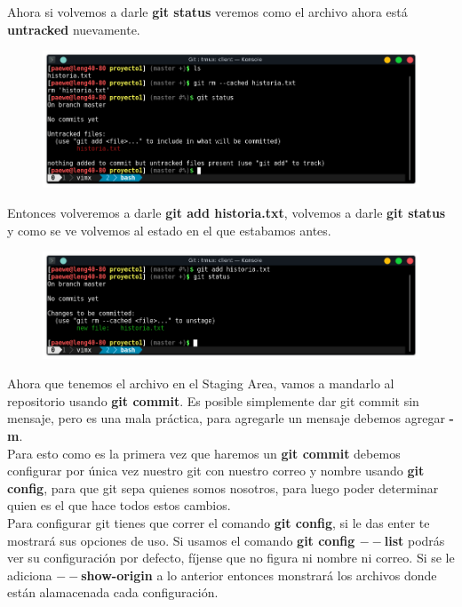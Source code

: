 \documentclass{article}
\begin{document}
Ahora si volvemos a darle \textbf{git status} veremos como el archivo ahora
está \textbf{untracked} nuevamente.

\begin{figure}[h!]
  \centering
  \includegraphics[scale=0.75]{./Pictures/074_quitar_staged.png}
\end{figure}

\newpage

Entonces volveremos a darle \textbf{git add historia.txt}, volvemos a darle
\textbf{git status} y como se ve volvemos al estado en el que estabamos antes.

\begin{figure}[h!]
  \centering
  \includegraphics[scale=0.75]{./Pictures/075_staged_again.png}
\end{figure}


Ahora que tenemos el archivo en el Staging Area, vamos a mandarlo al
repositorio usando \textbf{git commit}. Es posible simplemente dar git commit
sin mensaje, pero es una mala práctica, para agregarle un mensaje debemos
agregar \textbf{-m}.\\

Para esto como es la primera vez que haremos un \textbf{git commit} debemos
configurar por única vez nuestro git con nuestro correo y nombre usando
\textbf{git config}, para que git sepa quienes somos nosotros, para luego poder
determinar quien es el que hace todos estos cambios.\\

Para configurar git tienes que correr el comando \textbf{git config}, si le das
enter te mostrará sus opciones de uso. Si usamos el comando \textbf{git config
$--$list} podrás ver su configuración por defecto, fíjense que no figura ni
nombre ni correo. Si se le adiciona \textbf{$--$show-origin} a lo anterior
entonces monstrará los archivos donde están alamacenada cada configuración.
\end{document}
